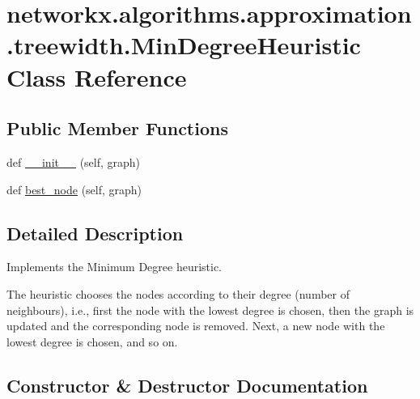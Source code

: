 \hypertarget{classnetworkx_1_1algorithms_1_1approximation_1_1treewidth_1_1MinDegreeHeuristic}{}\section{networkx.\+algorithms.\+approximation.\+treewidth.\+Min\+Degree\+Heuristic Class Reference}
\label{classnetworkx_1_1algorithms_1_1approximation_1_1treewidth_1_1MinDegreeHeuristic}
\subsection*{Public Member Functions}
\begin{DoxyCompactItemize}
\item 
def \hyperlink{classnetworkx_1_1algorithms_1_1approximation_1_1treewidth_1_1MinDegreeHeuristic_acf3f924748d115784e3e3d4e4a6f438c}{\+\_\+\+\_\+init\+\_\+\+\_\+} (self, graph)
\item 
def \hyperlink{classnetworkx_1_1algorithms_1_1approximation_1_1treewidth_1_1MinDegreeHeuristic_abc778375ae488ddc978e555a7eba00d4}{best\+\_\+node} (self, graph)
\end{DoxyCompactItemize}


\subsection{Detailed Description}
\begin{DoxyVerb}Implements the Minimum Degree heuristic.

The heuristic chooses the nodes according to their degree
(number of neighbours), i.e., first the node with the lowest degree is
chosen, then the graph is updated and the corresponding node is
removed. Next, a new node with the lowest degree is chosen, and so on.
\end{DoxyVerb}
 

\subsection{Constructor \& Destructor Documentation}
\mbox{\label{classnetworkx_1_1algorithms_1_1approximation_1_1treewidth_1_1MinDegreeHeuristic_acf3f924748d115784e3e3d4e4a6f438c}} 
